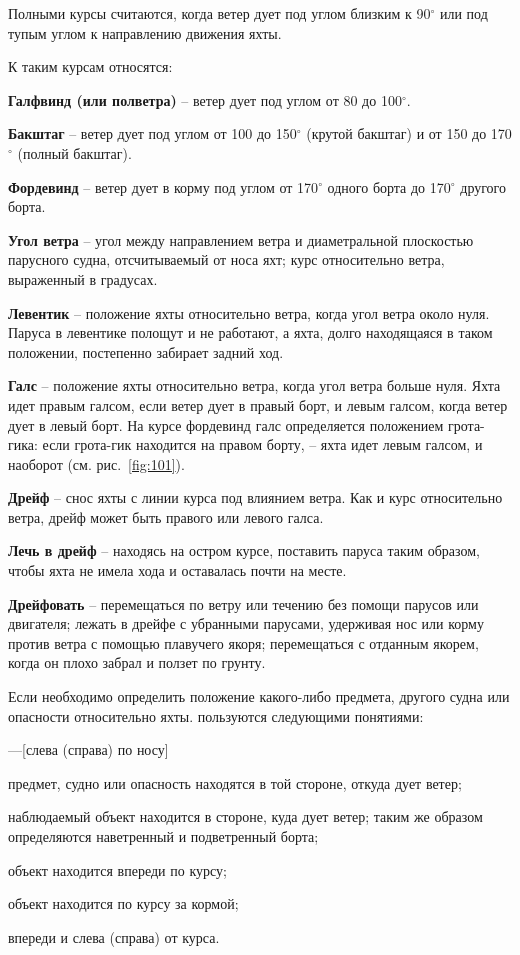 \documentclass[a4paper, 12pt, twoside, final]{scrbook}
\begin{document}
Полными курсы считаются, когда ветер дует под углом близким к 90$^\circ$ или под тупым углом к направлению движения яхты.

К таким курсам относятся:

\textbf{Галфвинд (или полветра)} \--- ветер дует под углом от 80 до 100$^\circ$.

\textbf{Бакштаг} \--- ветер дует под углом от 100 до 150$^\circ$ (крутой бакштаг) и от 150 до 170$^\circ$ (полный бакштаг).

\textbf{Фордевинд} \--- ветер дует в корму под углом от 170$^\circ$ одного борта до 170$^\circ$ другого борта.

\textbf{Угол ветра} \--- угол между направлением ветра и диаметральной плоскостью парусного судна, отсчитываемый от носа яхт; курс относительно ветра, выраженный в градусах.

\textbf{Левентик} \--- положение яхты относительно ветра, когда угол ветра около нуля. Паруса в левентике полощут и не работают, а яхта, долго находящаяся в таком положении, постепенно забирает задний ход.

\textbf{Галс} \--- положение яхты относительно ветра, когда угол ветра больше нуля. Яхта идет правым галсом, если ветер дует в правый борт, и левым галсом, когда ветер дует в левый борт. На курсе фордевинд галс определяется положением грота-гика: если грота-гик находится на правом борту, \--- яхта идет левым галсом, и наоборот (см. рис.~\ref{fig:101}).

\textbf{Дрейф} \--- снос яхты с линии курса под влиянием ветра. Как и курс относительно ветра, дрейф может быть правого или левого галса.

\textbf{Лечь в дрейф} \--- находясь на остром курсе, поставить паруса таким образом, чтобы яхта не имела хода и оставалась почти на месте.

\textbf{Дрейфовать} \--- перемещаться по ветру или течению без помощи парусов или двигателя; лежать в дрейфе с убранными парусами, удерживая нос или корму против ветра с помощью плавучего якоря; перемещаться с отданным якорем, когда он плохо забрал и ползет по грунту.

Если необходимо определить положение какого-либо предмета, другого судна или опасности относительно яхты. пользуются следующими понятиями:
\begin{desclist}{\bfseries}{ \hfill---}[слева (справа) по носу]
\item[на ветре] предмет, судно или опасность находятся в той стороне, откуда дует ветер;
\item[под ветром] наблюдаемый объект находится в стороне, куда дует ветер; таким же образом определяются наветренный и подветренный борта;
\item[прямо по носу] объект находится впереди по курсу;
\item[прямо по корме] объект находится по курсу за кормой;
\item[слева (справа) по носу] впереди и слева (справа) от курса.
\end{desclist}
\end{document}
